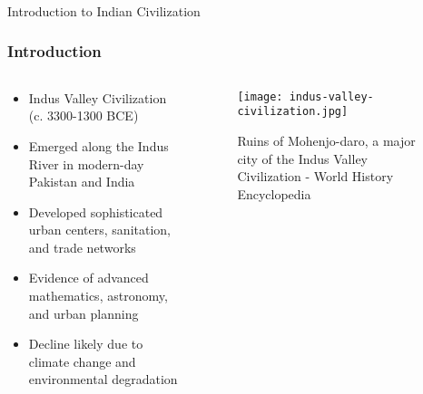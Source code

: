 \begin{frame}[fragile]\frametitle{}
\begin{center}
{\Large Introduction to Indian Civilization}
\end{center}
\end{frame}

\begin{frame}[fragile]\frametitle{Introduction}
\begin{columns}
\begin{column}{0.5\textwidth}
\begin{itemize}
\item Indus Valley Civilization (c. 3300-1300 BCE)
\item Emerged along the Indus River in modern-day Pakistan and India
\item Developed sophisticated urban centers, sanitation, and trade networks
\item Evidence of advanced mathematics, astronomy, and urban planning
\item Decline likely due to climate change and environmental degradation
\end{itemize}
\end{column}
\begin{column}{0.5\textwidth}
\begin{figure}
\texttt{[image: indus-valley-civilization.jpg]}
\caption{Ruins of Mohenjo-daro, a major city of the Indus Valley Civilization - World History Encyclopedia}
\end{figure}
\end{column}
\end{columns}
\end{frame}